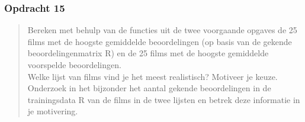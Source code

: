 \documentclass[11pt, a4paper, titlepage, openright]{article}
\begin{document}
	\subsubsection{Opdracht 15}
    \begin{quote}
        Bereken met behulp van de functies uit de twee voorgaande opgaves de 25 films met de hoogste gemiddelde beoordelingen
        (op basis van de gekende beoordelingenmatrix R) en de 25 films met de hoogste gemiddelde voorspelde beoordelingen. \\
        Welke lijst van films vind je het meest realistisch? Motiveer je keuze. Onderzoek in het bijzonder het aantal gekende
        beoordelingen in de trainingsdata R van de films in de twee lijsten en betrek deze informatie in je motivering.
    \end{quote}
\end{document}
